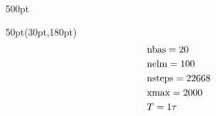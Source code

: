 \begin{frame}
\begin{textblock*}{500pt}
\begin{minipage}{0.0\linewidth}
\end{minipage}
\end{textblock*}


\begin{textblock*}{50pt}(30pt,180pt)
\scriptsize
\begin{align}
& {\rm nbas}   = 20                 \nonumber\\
& {\rm nelm}   = 100                \nonumber\\ 
& {\rm nsteps} = 22668              \nonumber\\ 
& {\rm xmax}   = 2000               \nonumber\\ 
& T = 1\tau                         \nonumber
\end{align}
\end{textblock*}

\end{frame}





